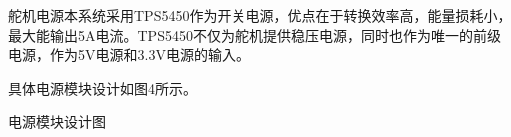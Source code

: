 \documentclass{article}%
\begin{document}
\begin{multicols}{2}
		舵机电源本系统采用TPS5450作为开关电源，优点在于转换效率高，能量损耗小，最大能输出5A电流。TPS5450不仅为舵机提供稳压电源，同时也作为唯一的前级电源，作为5V电源和3.3V电源的输入。
		
		具体电源模块设计如图4所示。
		\begin{center}
			\caption{电源模块设计图}		
		\end{center}
		
		

\end{multicols}
\end{document}
